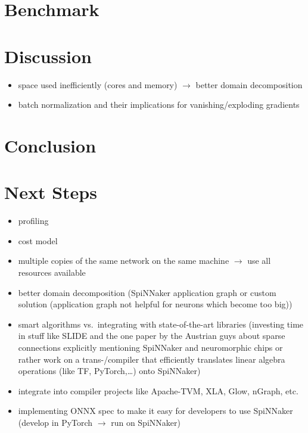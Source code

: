 \documentclass[]{article}
\begin{document}
\section{Benchmark}
\label{sec:benchmark}

\section{Discussion}
\label{sec:discussion}

\begin{itemize}
  \item space used inefficiently (cores and memory) $\rightarrow$ better
    domain decomposition
  \item batch normalization and their implications for
    vanishing/exploding gradients
\end{itemize}

\section{Conclusion}
\label{sec:conclusion}

\section{Next Steps}
\label{sec:next_steps}

\begin{itemize}
  \item profiling
  \item cost model
  \item multiple copies of the same network on the same machine
    $\rightarrow$ use all resources available
  \item better domain decomposition (SpiNNaker application graph or
    custom solution (application graph not helpful for neurons which
    become too big))
  \item smart algorithms vs.\ integrating with state-of-the-art libraries
    (investing time in stuff like SLIDE and the one paper by the Austrian
    guys about sparse connections explicitly mentioning SpiNNaker and
    neuromorphic chips or rather work on a trans-/compiler
    that efficiently translates linear algebra operations (like TF,
    PyTorch,\dots) onto SpiNNaker)
  \item integrate into compiler projects like Apache-TVM, XLA, Glow,
   nGraph, etc.
  \item implementing ONNX spec to make it easy for developers to use
    SpiNNaker (develop in PyTorch $\rightarrow$ run on SpiNNaker)
\end{itemize}


\end{document}
